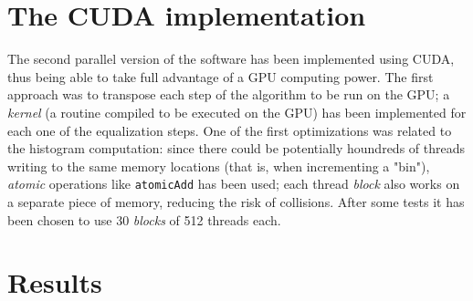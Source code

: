 \documentclass[10pt,twocolumn,letterpaper]{article}
\begin{document}
\section{The CUDA implementation}

The second parallel version of the software has been implemented using CUDA, thus being
able to take full advantage of a GPU computing power. The first approach was to transpose
each step of the algorithm to be run on the GPU; a \emph{kernel} (a routine compiled to be
executed on the GPU) has been implemented for each one of the equalization steps.
One of the first optimizations was related to the histogram computation: since there could
be potentially houndreds of threads writing to the same memory locations (that is, when
incrementing a "bin"), \emph{atomic} operations like \verb|atomicAdd| has been used; each
thread \emph{block} also works on a separate piece of memory, reducing the risk of collisions.
After some tests it has been chosen to use 30 \emph{blocks} of 512 threads each.

\section{Results}


\newpage

\nocite{*}
 

\end{document}
